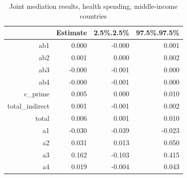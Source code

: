 \begin{table}[ht]
\centering
\begin{tabular}{rrrr}
  \hline
 & Estimate & 2.5\%.2.5\% & 97.5\%.97.5\% \\ 
  \hline
ab1 & 0.000 & -0.000 & 0.001 \\ 
  ab2 & 0.001 & 0.000 & 0.002 \\ 
  ab3 & -0.000 & -0.001 & 0.000 \\ 
  ab4 & -0.000 & -0.001 & 0.000 \\ 
  c\_prime & 0.005 & 0.000 & 0.010 \\ 
  total\_indirect & 0.001 & -0.001 & 0.002 \\ 
  total & 0.006 & 0.001 & 0.010 \\ 
  a1 & -0.030 & -0.039 & -0.023 \\ 
  a2 & 0.031 & 0.013 & 0.050 \\ 
  a3 & 0.162 & -0.103 & 0.415 \\ 
  a4 & 0.019 & -0.004 & 0.043 \\ 
   \hline
\end{tabular}
\caption{Joint mediation results, health spending, middle-income countries} 
\end{table}
